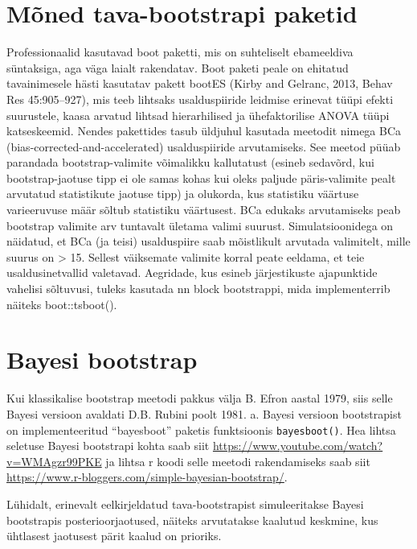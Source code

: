 \documentclass[]{book}
\begin{document}
\hypertarget{moned-tava-bootstrapi-paketid}{%
\section{Mõned tava-bootstrapi paketid}\label{moned-tava-bootstrapi-paketid}}

Professionaalid kasutavad boot paketti, mis on suhteliselt ebameeldiva süntaksiga, aga väga laialt rakendatav. Boot paketi peale on ehitatud tavainimesele hästi kasutatav pakett bootES (Kirby and Gelranc, 2013, Behav Res 45:905--927), mis teeb lihtsaks usalduspiiride leidmise erinevat tüüpi efekti suurustele, kaasa arvatud lihtsad hierarhilised ja ühefaktorilise ANOVA tüüpi katseskeemid. Nendes pakettides tasub üldjuhul kasutada meetodit nimega BCa (bias-corrected-and-accelerated) usalduspiiride arvutamiseks. See meetod püüab parandada bootstrap-valimite võimalikku kallutatust (esineb sedavõrd, kui bootstrap-jaotuse tipp ei ole samas kohas kui oleks paljude päris-valimite pealt arvutatud statistikute jaotuse tipp) ja olukorda, kus statistiku väärtuse varieeruvuse määr sõltub statistiku väärtusest. BCa edukaks arvutamiseks peab bootstrap valimite arv tuntavalt ületama valimi suurust. Simulatsioonidega on näidatud, et BCa (ja teisi) usalduspiire saab mõistlikult arvutada valimitelt, mille suurus on \textgreater{} 15. Sellest väiksemate valimite korral peate eeldama, et teie usaldusinetvallid valetavad.
Aegridade, kus esineb järjestikuste ajapunktide vahelisi sõltuvusi, tuleks kasutada nn block bootstrappi, mida implementerrib näiteks boot::tsboot().

\hypertarget{bayesi-bootstrap}{%
\section*{Bayesi bootstrap}\label{bayesi-bootstrap}}

Kui klassikalise bootstrap meetodi pakkus välja B. Efron aastal 1979, siis selle Bayesi versioon avaldati D.B. Rubini poolt 1981. a.
Bayesi versioon bootstrapist on implementeeritud ``bayesboot'' paketis funktsioonis \texttt{bayesboot()}.
Hea lihtsa seletuse Bayesi bootstrapi kohta saab siit \url{https://www.youtube.com/watch?v=WMAgzr99PKE} ja lihtsa r koodi selle meetodi rakendamiseks saab siit \url{https://www.r-bloggers.com/simple-bayesian-bootstrap/}.

Lühidalt, erinevalt eelkirjeldatud tava-bootstrapist simuleeritakse Bayesi bootstrapis posterioorjaotused, näiteks arvutatakse kaalutud keskmine, kus ühtlasest jaotusest pärit kaalud on prioriks.
\end{document}
